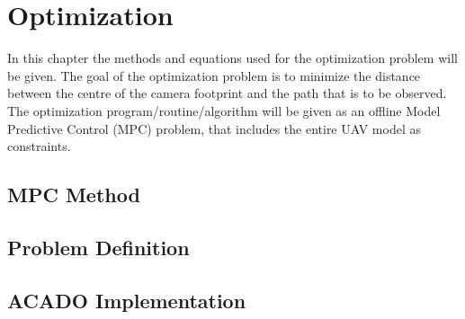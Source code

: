\section{Optimization}

In this chapter the methods and equations used for the optimization problem will be given. The goal of the optimization problem is to minimize the distance between the centre of the camera footprint and the path that is to be observed. The optimization program/routine/algorithm will be given as an offline Model Predictive Control (MPC) problem, that includes the entire UAV model as constraints.

\subsection{MPC Method}

\subsection{Problem Definition}

\subsection{ACADO Implementation}